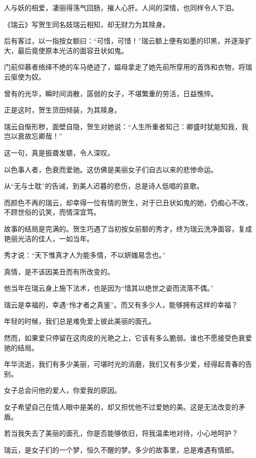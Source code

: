 \documentclass[12pt,a4paper]{article}
\def\blankrev{\vspace{1ex}}									%
\begin{document}
		\blankrev
		人与妖的相爱，凄丽得荡气回肠，摧人心肝。人间的深情，也同样令人下泪。\par
		《瑞云》写贺生同名妓瑞云相知，却无财力为其赎身。\par
		后有客过，以一指按女额曰：“可惜，可惜！”瑞云额上便有如墨的印黑，并逐渐扩大，最后竟使原本光洁的面容丑状如鬼。\par
		门前仰慕者络绎不绝的车马绝迹了，媪母拿走了她先前所穿用的首饰和衣物，将瑞云驱使为奴。\par
		曾有的光华，瞬时间消散，孱弱的女子，不堪繁重的劳活，日益憔悴。\par
		正是这时，贺生货田倾装，为其赎身。\par
		瑞云自惭形秽，面壁自隐，贺生对她说：“人生所重者知己：卿盛时犹能知我，我岂以衰故忘卿哉！”\par
		这一句，真是振聋发聩，令人深叹。\par
		以色事人者，色衰而爱驰。这仿佛是美丽女子们自古以来的悲惨命运。\par
		从“无与士耽”的告诫，到美人迟暮的悲伤，总是诗人低唱的哀歌。\par
		而颜色不再的瑞云，却幸得一位有情的贺生，对于已丑状如鬼的她，仍痴心不改，不顾世俗的讥笑，而情深宜笃。\par
		故事的结局是完满的。贺生巧遇了当初按女前额的秀才，终为瑞云洗净面容，复成艳丽光洁的佳人，一如当年。\par
		秀才说：“天下惟真才人为能多情，不以妍媸易念也。”\par
		真情，是不该因美丑而有所改变的。\par
		他当年在瑞云身上施下法术，也是因为“惜其以绝世之姿而流落不偶。”

		\blankrev
		瑞云是幸福的，幸遇“怜才者之真鉴”。而又有多少人，能够拥有这样的幸福？\par
		年轻的时候，我们总是难免爱上彼此美丽的面孔。\par
		然而，如果爱只停留在这肉皮的光艳之上，它该有多么脆弱。谁也不愿接受色衰爱驰的结局。\par
		年华流逝，我们有多少美丽，可堪时光的消磨，我们又有多少爱，经得起青春的告别。\par
		女子总会问他的爱人，你爱我的原因。\par
		女子希望自己在情人眼中是美的，却又担忧他不过爱她的美。这是无法改变的矛盾。

		\blankrev
		若当我失去了美丽的面孔，你是否能够依旧，将我温柔地对待，小心地呵护？\par
		瑞云，是女子们的一个梦，恒久不醒的梦。多少的故事里，总是难遇有情郎。
\end{document}
